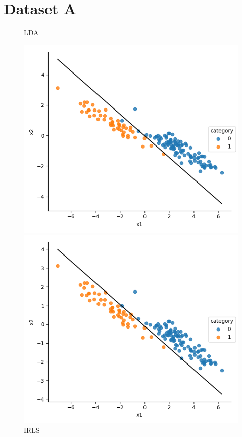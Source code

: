 \documentclass[a4paper]{article}
\begin{document}
\section{Dataset A}
\begin{figure}[h]
\centering
\begin{minipage}{0,45\textwidth}
\caption{LDA}
\includegraphics[scale=.45]{a_lda.png}
\end{minipage}
\begin{minipage}{0,45\textwidth}
\caption{IRLS}
\includegraphics[scale=.45]{a_irls.png}

\end{minipage}
\end{figure}
\end{document}
